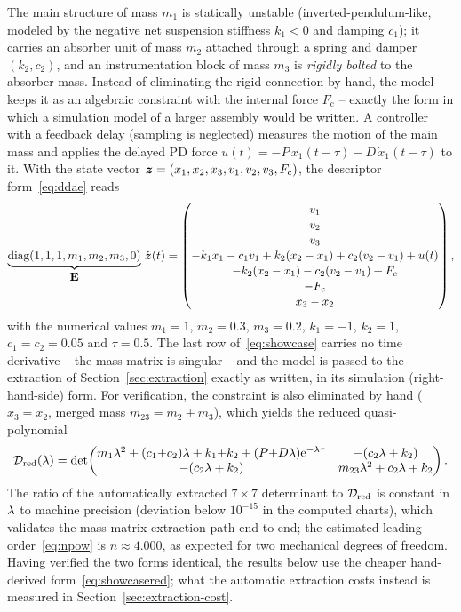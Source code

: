 The main structure of mass $m_1$ is statically unstable
(inverted-pendulum-like, modeled by the negative net suspension stiffness
$k_1<0$ and damping $c_1$); it carries an absorber unit of mass $m_2$
attached through a spring and damper $(k_2, c_2)$, and an instrumentation
block of mass $m_3$ is \emph{rigidly bolted} to the absorber mass. Instead of
eliminating the rigid connection by hand, the model keeps it as an algebraic
constraint with the internal force $F_{\mathrm c}$ -- exactly the form in
which a simulation model of a larger assembly would be written. A controller
with a feedback delay (sampling is neglected) measures the motion of the main
mass and applies the delayed PD
force $u(t) = -P\,x_1(t-\tau) - D\,\dot x_1(t-\tau)$ to it. With the state
vector $\boldsymbol{z} = (x_1,x_2,x_3,v_1,v_2,v_3,F_{\mathrm c})$, the descriptor
form~\eqref{eq:ddae} reads
\begin{equation}\label{eq:showcase}
  \underbrace{\operatorname{diag}(1,1,1,m_1,m_2,m_3,0)}_{\textstyle\mathbf{E}}\,
  \dot{\boldsymbol{z}}(t) =
  \begin{pmatrix}
    v_1\\[1pt] v_2\\[1pt] v_3\\[1pt]
    -k_1 x_1 - c_1 v_1 + k_2(x_2-x_1) + c_2(v_2-v_1) + u(t)\\[1pt]
    -k_2(x_2-x_1) - c_2(v_2-v_1) + F_{\mathrm c}\\[1pt]
    -F_{\mathrm c}\\[1pt]
    x_3 - x_2
  \end{pmatrix},
\end{equation}
with the numerical values $m_1=1$, $m_2=0.3$, $m_3=0.2$, $k_1=-1$, $k_2=1$,
$c_1=c_2=0.05$ and $\tau=0.5$. The last row of~\eqref{eq:showcase} carries no
time derivative -- the mass matrix is singular -- and the model is passed to
the extraction of Section~\ref{sec:extraction} exactly as written, in its
simulation (right-hand-side) form. For verification, the constraint is also
eliminated by hand ($x_3=x_2$, merged mass $m_{23}=m_2+m_3$), which yields
the reduced quasi-polynomial
\begin{equation}\label{eq:showcasered}
  \mathcal{D}_{\mathrm{red}}(\lambda)=\det\!\begin{pmatrix}
   m_1\lambda^2+(c_1{+}c_2)\lambda+k_1{+}k_2+(P{+}D\lambda)\mathrm{e}^{-\lambda\tau} &
   -(c_2\lambda+k_2)\\
   -(c_2\lambda+k_2) &
   m_{23}\lambda^2+c_2\lambda+k_2
  \end{pmatrix}.
\end{equation}
The ratio of the automatically extracted $7\times7$ determinant to
$\mathcal{D}_{\mathrm{red}}$ is constant in $\lambda$ to machine precision
(deviation below $10^{-15}$ in the computed charts), which validates the
mass-matrix extraction path end to end; the estimated leading
order~\eqref{eq:npow} is $n\approx4.000$, as expected for two mechanical
degrees of freedom. Having verified the two forms identical, the results
below use the cheaper hand-derived form~\eqref{eq:showcasered}; what the
automatic extraction costs instead is measured in
Section~\ref{sec:extraction-cost}.

